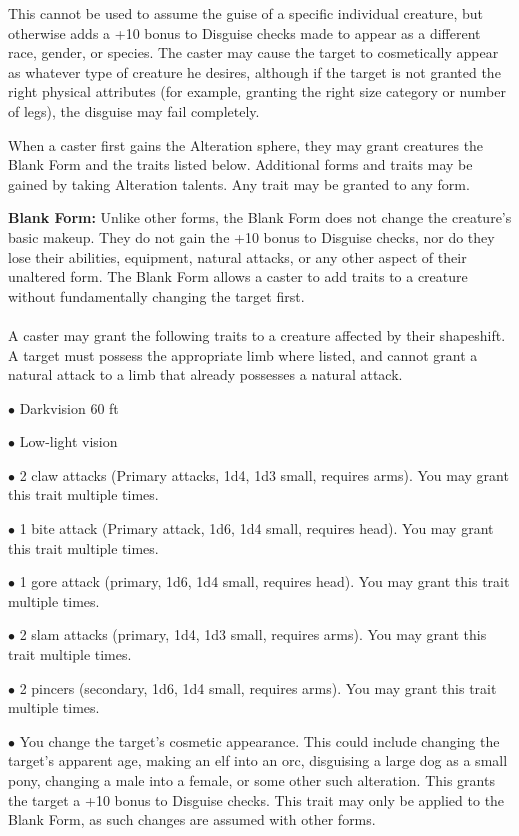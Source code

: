 {	This cannot be used to assume the guise of a specific individual creature, but otherwise adds a +10 bonus to Disguise checks made to appear as a different race, gender, or species. The caster may cause the target to cosmetically appear as whatever type of creature he desires, although if the target is not granted the right physical attributes (for example, granting the right size category or number of legs), the disguise may fail completely.\par
	When a caster first gains the Alteration sphere, they may grant creatures the Blank Form and the traits listed below. Additional forms and traits may be gained by taking Alteration talents. Any trait may be granted to any form.\par
	\textbf{Blank Form:} Unlike other forms, the Blank Form does not change the creature's basic makeup. They do not gain the +10 bonus to Disguise checks, nor do they lose their abilities, equipment, natural attacks, or any other aspect of their unaltered form. The Blank Form allows a caster to add traits to a creature without fundamentally changing the target first.\\\\
	A caster may grant the following traits to a creature affected by their shapeshift. A target must possess the appropriate limb where listed, and cannot grant a natural attack to a limb that already possesses a natural attack.\par
	$\bullet$ Darkvision 60 ft\par
	$\bullet$ Low-light vision\par
	$\bullet$ 2 claw attacks (Primary attacks, 1d4, 1d3 small, requires arms). You may grant this trait multiple times.\par
	$\bullet$ 1 bite attack (Primary attack, 1d6, 1d4 small, requires head). You may grant this trait multiple times.\par
	$\bullet$ 1 gore attack (primary, 1d6, 1d4 small, requires head). You may grant this trait multiple times.\par
	$\bullet$ 2 slam attacks (primary, 1d4, 1d3 small, requires arms). You may grant this trait multiple times.\par
	$\bullet$ 2 pincers (secondary, 1d6, 1d4 small, requires arms). You may grant this trait multiple times.\par
	$\bullet$ You change the target's cosmetic appearance. This could include changing the target's apparent age, making an elf into an orc, disguising a large dog as a small pony, changing a male into a female, or some other such alteration. This grants the target a +10 bonus to Disguise checks. This trait may only be applied to the Blank Form, as such changes are assumed with other forms.
}
